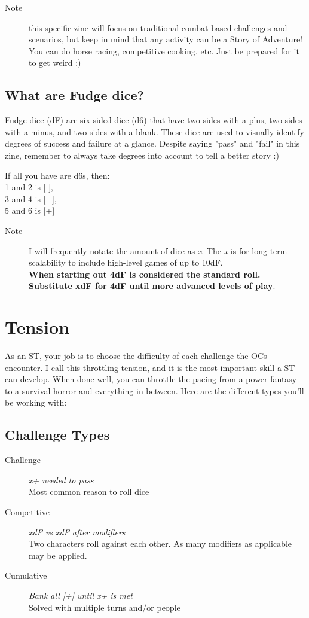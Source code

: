\documentclass[statementpaper,oneside,article,12pt]{memoir}
\begin{document}
	\begin{description}
		\item[Note] this specific zine will focus on traditional combat based challenges and scenarios, but keep in mind that any activity can be a Story of Adventure!  You can do horse racing, competitive cooking, etc. Just be prepared for it to get weird :)
	\end{description}
	
	\subsection*{What are Fudge dice?}
	Fudge dice (dF) are six sided dice (d6) that have two sides with a plus, two sides with a minus, and two sides with a blank. These dice are used to visually identify degrees of success and failure at a glance. Despite saying "pass" and "fail" in this zine, remember to always take degrees into account to tell a better story :)
	
	If all you have are d6s, then:\\
		 1 and 2 is [-], \\
		 3 and 4 is [\_], \\
		 5 and 6 is [+]
	
	\begin{description}
		\item[Note] I will frequently notate the amount of dice as \textit{x}. The \textit{x} is for long term scalability to include high-level games of up to 10dF.\\
		\textbf{When starting out 4dF is considered the standard roll. Substitute xdF for 4dF until more advanced levels of play}.
	\end{description}	 
	 
	
	\section*{Tension}
	As an ST, your job is to choose the difficulty of each challenge the OCs encounter. I call this throttling tension, and it is the most important skill a ST can develop. When done well, you can throttle the pacing from a power fantasy to a survival horror and everything in-between. Here are the different types you'll be working with:
	
	\subsection*{Challenge Types}
	\begin{description}
		\item[Challenge] \textit{x+ needed to pass} \\Most common reason to roll dice
		\item[Competitive] \textit{ xdF vs xdF after modifiers} \\Two characters roll against each other. As many modifiers as applicable may be applied.
		\item[Cumulative] \textit{Bank all {[+]} until x+ is met} \\Solved with multiple turns and/or people
	\end{description}
\end{document}
